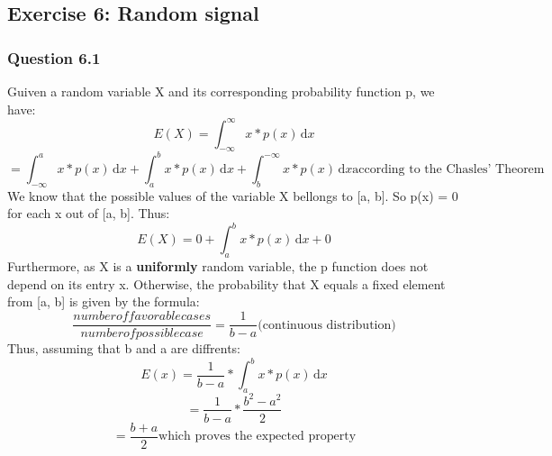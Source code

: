 \documentclass[a4paper,10pt]{article}
\begin{document}
	
    \subsection{Exercise 6: Random signal}
	\subsubsection{Question 6.1 }
	Guiven a random variable X and its corresponding probability function p, we have:
	\begin{equation}E(X) = \int_{-\infty}^{\infty} \! x*p(x) \, \mathrm{d}x \end{equation}
	\begin{equation}     = \int_{-\infty}^{a} \! x*p(x) \, \mathrm{d}x + \int_{a}^{b} \! x*p(x) \, \mathrm{d}x + \int_{b}^{-\infty} \! x*p(x) \, \mathrm{d}x \mbox{according to the Chasles' Theorem} \end{equation}
	We know that the possible values of the variable X bellongs to [a, b].  So p(x) = 0 for each x out of [a, b]. Thus:
	\begin{equation}E(X) = 0 + \int_{a}^{b} \! x*p(x) \, \mathrm{d}x + 0 \end{equation}
	Furthermore, as X is a \textbf{uniformly} random variable, the p function does not depend on its entry x.  Otherwise, the probability that X equals a fixed element from [a, b] is given by the formula:
	\begin{equation} \frac {number of favorable cases}{number of possible case} = \frac{1}{b-a} \mbox{(continuous distribution)}\end{equation}
	Thus, assuming that b and a are diffrents:
	\begin{equation}E(x) = \frac{1}{b-a} * \int_{a}^{b} \! x*p(x) \, \mathrm{d}x\end{equation}
	\begin{equation}     = \frac{1}{b-a} * \frac{b^2 - a^2}{2}\end{equation}
	\begin{equation}     = \frac{b+a}{2} \mbox{which proves the expected property}\end{equation}
\end{document}
